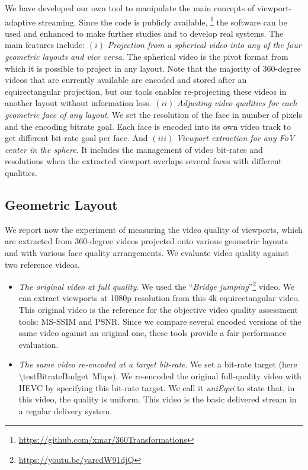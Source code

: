 We have developed our own tool to manipulate the main concepts
of viewport-adaptive streaming. Since the code is publicly available,%
\footnote{\url{https://github.com/xmar/360Transformations}} the software can be used and enhanced
to make further studies and to develop real systems. The main
features include: $(i)$ \emph{Projection from a spherical video into any of the four
geometric layouts and vice versa}. The spherical video is the pivot format from which it
is possible to project in any layout.
Note that the majority of 360-degree videos that are currently available are encoded and stored after
an equirectangular projection, but our tools enables re-projecting these videos
in another layout without information loss.  $(ii)$ \emph{Adjusting video qualities for each
geometric face of any
layout}. We set the resolution of the face in number of
pixels and the encoding bitrate goal. Each face is encoded into its own video
track to get different
bit-rate goal per face. And $(iii)$ \emph{Viewport extraction for any \ac{FoV} center in the
sphere}. It includes the management of video bit-rates and resolutions
when the extracted viewport overlaps several faces with different qualities.

\subsection{Geometric Layout}

We report now the experiment of measuring the video quality of viewports, which
are extracted from 360-degree videos projected onto various geometric layouts and
with various
face quality arrangements. We evaluate video quality against two reference videos.
\begin{itemize}[leftmargin=7pt, itemindent=0pt, topsep=2pt, itemsep=0pt]
\item \emph{The original video at full quality}. We used the
``\emph{Bridge
jumping}''\footnote{\url{https://youtu.be/yarcdW91djQ}} video. We can extract viewports at 1080p resolution from this 4k equirectangular
video. This original video
is the reference for the objective video quality assessment tools: \ac{MS-SSIM} and
\ac{PSNR}. Since we compare several encoded versions of the same video against an original
one, these tools provide
a fair performance evaluation.
\item \emph{The same video re-encoded at a target bit-rate}. We set
a bit-rate target (here \SI{\testBitrateBudget}{\mega bps}). We
re-encoded the original full-quality video with \ac{HEVC} by specifying this bit-rate target. We call it \emph{uniEqui} to state that, in this
video, the quality is uniform. This video is the basic delivered stream in a regular delivery
system.
\end{itemize}

